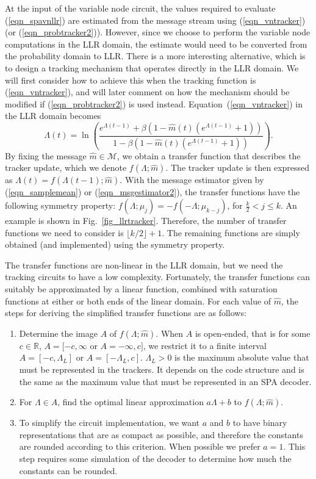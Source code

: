 \documentclass[12pt,journal,twoside,draftcls,onecolumn]{IEEEtran}
\begin{document}
	
	At the input of the variable node circuit, the values required to evaluate (\ref{eqn_spavnllr}) are estimated from the message stream using (\ref{eqn_vntracker}) (or (\ref{eqn_probtracker2})). However, since we choose to perform the variable node computations in the LLR domain, the estimate would need to be converted from the probability domain to LLR.
	There is a more interesting alternative, which is to design a tracking mechanism that operates directly in the LLR domain. 
	We will first consider how to achieve this when the tracking function is (\ref{eqn_vntracker}), and will later comment on how the mechanism should be modified if (\ref{eqn_probtracker2}) is used instead. Equation~(\ref{eqn_vntracker}) in the LLR domain becomes
	\begin{equation}
	\label{eqn_llrtracker}
	\Lambda(t) = \ln \left(
		\frac{e^{\Lambda(t-1)} + \beta (1 - \hat{m}(t) (e^{\Lambda(t-1)}+1)) }
		        {1 - \beta (1 - \hat{m}(t) (e^{\Lambda(t-1)}+1)) } \right).
	\end{equation}
	By fixing the message $\hat{m} \in \mathcal{M}$, we obtain a transfer function that describes the tracker update, which we denote $f(\Lambda; \hat{m})$. The tracker update is then expressed as
$\Lambda(t) = f(\Lambda(t-1); \hat{m})$.
With the message estimator given by (\ref{eqn_samplemean}) or (\ref{eqn_msgestimator2}), the transfer functions have the following symmetry property: $f(\Lambda; \mu_j) = -f(-\Lambda; \mu_{k-j})$, for $\frac{k}{2} < j \leq k$. An example is shown in Fig.~\ref{fig_llrtracker}.
	Therefore, the number of transfer functions we need to consider is $\lfloor k / 2 \rfloor + 1$. The remaining functions are simply obtained (and implemented) using the symmetry property.
	
	The transfer functions are non-linear in the LLR domain, but we need the tracking circuits to have a low complexity. Fortunately, the transfer functions can suitably be approximated by a linear function, combined with saturation functions at either or both ends of the linear domain. For each value of $\hat{m}$, the steps for deriving the simplified transfer functions are as follows:
	\begin{enumerate}
	\item Determine the image $A$ of $f(\Lambda; \hat{m})$. When $A$ is open-ended, that is for some $c \in \mathbb{R}$, $A=[-c, \infty$ or $A=-\infty, c]$, we restrict it to a finite interval $A=[-c, \Lambda_L]$ or $A=[-\Lambda_L, c]$. $\Lambda_L > 0$ is the maximum absolute value that must be represented in the trackers. It depends on the code structure and is the same as the maximum value that must be represented in an SPA decoder.
	\item For $\Lambda \in A$, find the optimal linear approximation $a \Lambda + b$ to $f(\Lambda; \hat{m})$.
	\item To simplify the circuit implementation, we want $a$ and $b$ to have binary representations that are as compact as possible, and therefore the constants are rounded according to this criterion. When possible we prefer $a=1$. This step requires some simulation of the decoder to determine how much the constants can be rounded.
	\end{enumerate}
	
\end{document}
